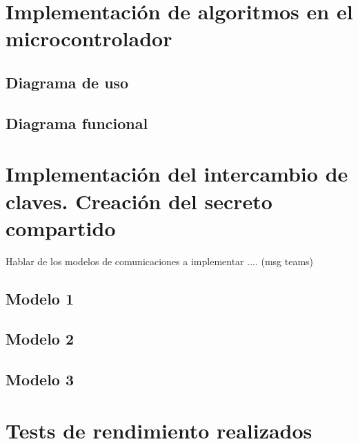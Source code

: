 \section{Implementación de algoritmos en el microcontrolador}
\subsection{Diagrama de uso}
\subsection{Diagrama funcional}

\section{Implementación del intercambio de claves. Creación del secreto compartido}
Hablar de los modelos de comunicaciones a implementar .... (msg teams)
\subsection{Modelo 1}
\subsection{Modelo 2}
\subsection{Modelo 3}
\section{Tests de rendimiento realizados}